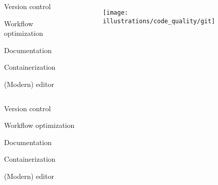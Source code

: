 \documentclass[usenames,dvipsnames]{beamer}
\theoremstyle{plain}
\theoremstyle{definition}
\begin{document}
\begin{frame}{\setframetitle{}}
  
  \begin{columns}[t]
    
    \begin{itemize}
      \item Version control 
      \textcolor{bg!85!normal text.fg}
      {\item Workflow optimization      
      \item Documentation
      \item Containerization 
      \item (Modern) editor}
      
    \end{itemize}
    
    \begin{figure}
      \captionsetup[subfigure]{justification=centering}
      \centering
      \subcaptionbox{}
      {\texttt{[image: illustrations/code\_quality/git]}}
    \end{figure}
  \end{columns}
  
\end{frame}




\begin{frame}{\setframetitle{}}
  
  \begin{columns}[t]
    
    \begin{itemize}
      \item \textcolor{bg!85!normal text.fg}{Version control}
      \item Workflow optimization     
      \textcolor{bg!85!normal text.fg}
      {\item Documentation
      \item Containerization  
      \item (Modern) editor} 
    \end{itemize}
    
    \begin{figure}
      \centering
      {}
    \end{figure}
  \end{columns}
  
\end{frame}
\end{document}
